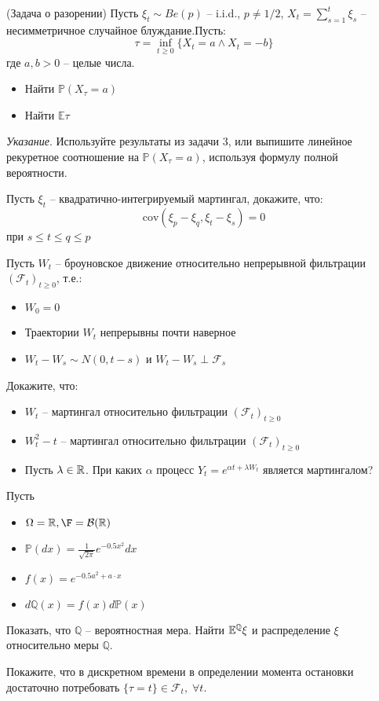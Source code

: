 \documentclass[12pt]{article}
\begin{document}
\begin{problem}(Задача о разорении)
    Пусть $\xi_t \sim Be(p)$ -- i.i.d., $p\neq 1/2$, $X_t = \sum_{s=1}^t \xi_s$ -- несимметричное случайное блуждание.Пусть:
    $$
        \tau = \inf_{t \geq 0} \{ X_t = a \wedge X_t =-b\}
    $$где $a, b > 0$ -- целые числа.

    \begin{itemize}
        \item Найти $\mathbb{P}(X_{\tau} = a)$
        \item Найти $\mathbb{E}\tau$
    \end{itemize}
    \textit{Указание}. Используйте результаты из задачи 3, или выпишите линейное рекуретное соотношение на $\mathbb{P}(X_{\tau} = a)$, используя формулу полной вероятности.
\end{problem}

\begin{problem}
    Пусть $\xi_t$ -- квадратично-интегрируемый мартингал, докажите, что:
    $$
        \mathrm{cov} (\xi_p - \xi_q, \xi_t - \xi_s) = 0
    $$ при $s \leq t \leq q \leq p$
\end{problem}

\begin{problem}
    Пусть $W_t$ -- броуновское движение относительно непрерывной фильтрации $(\mathcal{F}_t)_{t\geq0}$, т.е.:
    \begin{itemize}
        \item $W_0 = 0$
        \item Траектории $W_t$ непрерывны почти наверное
        \item $W_t - W_s \sim N(0, t-s)$ и $W_t - W_s \perp \mathcal{F}_s$
    \end{itemize}

    Докажите, что:
    \begin{itemize}
        \item $W_t$ -- мартингал относительно фильтрации $(\mathcal{F}_t)_{t\geq0}$
        \item $W_t^2 -t$ -- мартингал относительно фильтрации $(\mathcal{F}_t)_{t\geq0}$
        \item Пусть $\lambda \in \mathbb{R}$. При каких $\alpha$ процесс 
        $Y_t = e^{\alpha t + \lambda W_t}$ является мартингалом?
    \end{itemize}
\end{problem}

\begin{problem}
    Пусть
    \begin{itemize}
        \item $\Omega=\R, \F = \mathcal{B}(\R)$ 
        \item $\mathbb{P}(dx) = \frac{1}{\sqrt{2\pi}}e^{-0.5x^2}dx$
        \item $f(x) = e^{-0.5 a^2+a\cdot x}$
        \item $d\mathbb{Q}(x) = f(x)d\mathbb{P}(x)$
    \end{itemize}

    Показать, что $\mathbb{Q}$ -- вероятностная мера. Найти $\mathbb{E}^{\mathbb{Q}}\xi$ и распределение $\xi$ относительно меры $\mathbb{Q}$.

\end{problem}

\begin{problem}
    Покажите, что в дискретном времени в определении момента остановки достаточно потребовать $\{\tau = t\} \in \mathcal{F}_t, \; \forall t$.  
\end{problem}
\end{document}
